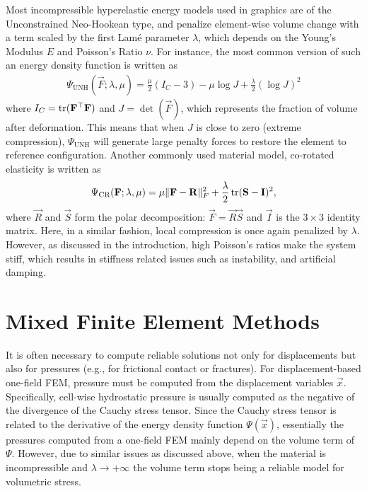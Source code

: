 Most incompressible hyperelastic energy models used in graphics are of
the Unconstrained Neo-Hookean type, and penalize element-wise volume change with a term scaled by
the first Lam\'e parameter $\lambda$, which depends on the Young's Modulus $E$ and Poisson's Ratio
$\nu$. For instance, the most common version of such an energy density function
\cite{BonetWood:2008} is written as
\begin{align}
\Psi_{\text{UNH}}(\vec{F}; \lambda, \mu) = \frac{\mu}{2}(I_C - 3) - \mu \log J + \frac{\lambda}{2} (\log J)^2
\label{eq:neohookean}
\end{align}
where $I_C = \operatorname*{tr}(\mathbf{F}^{\top}\mathbf{F})$ and $J = \det(\vec{F})$, which represents the fraction of
volume after deformation. This means that when $J$ is close to zero (extreme compression),
$\Psi_{\text{UNH}}$ will generate large penalty forces to restore the element to reference
configuration. Another commonly used material model, co-rotated elasticity \cite{McAdams:2011} is written as
\begin{align*}
\Psi_{\text{CR}}(\mathbf{F}; \lambda, \mu) = \mu\|\mathbf{F} - \mathbf{R}\|^2_F + \frac{\lambda}{2} \operatorname*{tr}(\mathbf{S} - \mathbf{I})^2,
\end{align*}
where $\vec{R}$ and $\vec{S}$ form the polar decomposition: $\vec{F} = \vec{R}\vec{S}$ and $\vec{I}$
is the $3\times3$ identity matrix. Here, in a similar fashion, local compression is once again
penalized by $\lambda$. However, as discussed in the introduction, high Poisson's ratios make the
system stiff, which results in stiffness related issues such as instability, and artificial damping.

\section{Mixed Finite Element Methods}

It is often necessary to compute reliable solutions not only for displacements but also for
pressures (e.g., for frictional contact or fractures). For displacement-based one-field FEM,
pressure must be computed from the displacement variables $\vec{x}$. Specifically, cell-wise
hydrostatic pressure is usually computed as the negative of the divergence of the Cauchy stress
tensor. Since the Cauchy stress tensor is related to the derivative of the energy density function
$\Psi(\vec{x})$, essentially the pressures computed from a one-field FEM mainly depend on the volume
term of $\Psi$. However, due to similar issues as discussed above, when the material is
incompressible and $\lambda \rightarrow +\infty$ the volume term stops being a reliable model for
volumetric stress.

